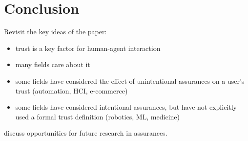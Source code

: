 \section{Conclusion} \label{sec:conclusions}
    Revisit the key ideas of the paper:

    \begin{itemize}
        \item trust is a key factor for human-agent interaction
        \item many fields care about it
        \item some fields have considered the effect of unintentional assurances on a user's trust (automation, HCI, e-commerce)
        \item some fields have considered intentional assurances, but have not explicitly used a formal trust definition (robotics, ML, medicine)
    \end{itemize}

    discuss opportunities for future research in assurances.

\newpage

